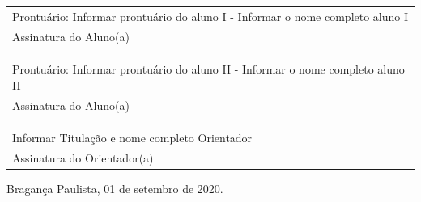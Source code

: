 \documentclass[12pt,a4paper]{report}
\newcommand{\orientador}{Informar Titulação e nome completo Orientador}
\newcommand{\orientadorA}{Assinatura do Orientador(a)}
\newcommand{\local}{Bragança Paulista, 01 de setembro de 2020.}
\newcommand{\alunoA}{Informar o nome completo aluno I}
\newcommand{\prontuarioA}{Informar prontuário do aluno I}
\newcommand{\alunoAD}{Assinatura do Aluno(a)}
\newcommand{\alunoB}{Informar o nome completo aluno II}
\newcommand{\prontuarioB}{Informar prontuário do aluno II}
\begin{document}
	\begin{table}[ht]
		\centering
		\begin{tabular}{C{10cm}}
		\\
		\footnotesize{Prontuário:} \footnotesize{\prontuarioA} - \footnotesize{\alunoA}  
		\\ \scriptsize{\alunoAD}  \\
		\\
		\\
		\\
		\footnotesize{Prontuário:} \footnotesize{\prontuarioB} - \footnotesize{\alunoB}  
		\\ \scriptsize{\alunoAD}  \\
		\\
		\\
		\\
	    \footnotesize{\orientador} 
		\\ \scriptsize{\orientadorA} 
		\end{tabular}
	\end{table}
	
\vspace{0.5cm}	
\flushright
	\footnotesize{\local} 
	
\end{document}
